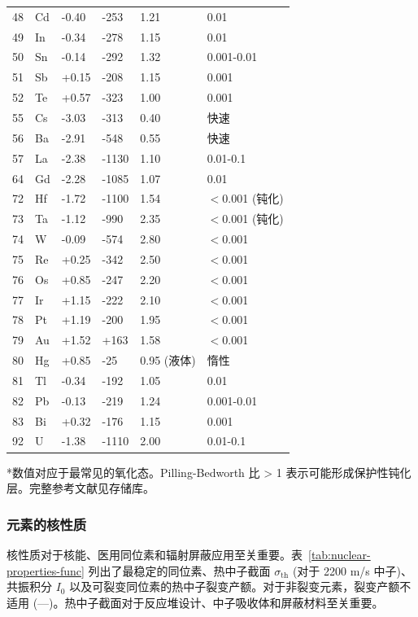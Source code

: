 \documentclass[12pt,a4paper]{article}
\begin{document}
\begin{longtable}{p{0.8cm}p{1.2cm}p{2.5cm}p{2.5cm}p{2.5cm}p{2.5cm}}
		48 & Cd & -0.40 & -253 & 1.21 & 0.01 \\
		49 & In & -0.34 & -278 & 1.15 & 0.01 \\
		50 & Sn & -0.14 & -292 & 1.32 & 0.001-0.01 \\
		51 & Sb & +0.15 & -208 & 1.15 & 0.001 \\
		52 & Te & +0.57 & -323 & 1.00 & 0.001 \\
		55 & Cs & -3.03 & -313 & 0.40 & 快速 \\
		56 & Ba & -2.91 & -548 & 0.55 & 快速 \\
		57 & La & -2.38 & -1130 & 1.10 & 0.01-0.1 \\
		64 & Gd & -2.28 & -1085 & 1.07 & 0.01 \\
		72 & Hf & -1.72 & -1100 & 1.54 & $<$0.001 (钝化) \\
		73 & Ta & -1.12 & -990 & 2.35 & $<$0.001 (钝化) \\
		74 & W  & -0.09 & -574 & 2.80 & $<$0.001 \\
		75 & Re & +0.25 & -342 & 2.50 & $<$0.001 \\
		76 & Os & +0.85 & -247 & 2.20 & $<$0.001 \\
		77 & Ir & +1.15 & -222 & 2.10 & $<$0.001 \\
		78 & Pt & +1.19 & -200 & 1.95 & $<$0.001 \\
		79 & Au & +1.52 & +163 & 1.58 & $<$0.001 \\
		80 & Hg & +0.85 & -25 & 0.95 (液体) & 惰性 \\
		81 & Tl & -0.34 & -192 & 1.05 & 0.01 \\
		82 & Pb & -0.13 & -219 & 1.24 & 0.001-0.01 \\
		83 & Bi & +0.32 & -176 & 1.15 & 0.001 \\
		92 & U  & -1.38 & -1110 & 2.00 & 0.01-0.1 \\
		\bottomrule
	\end{longtable}
	*数值对应于最常见的氧化态。Pilling-Bedworth 比 > 1 表示可能形成保护性钝化层。完整参考文献见存储库。
	
	\subsubsection{元素的核性质}
	\label{subsec:nuclear-properties-func}
	
	核性质对于核能、医用同位素和辐射屏蔽应用至关重要。表~\ref{tab:nuclear-properties-func} 列出了最稳定的同位素、热中子截面 \(\sigma_{\text{th}}\) (对于 2200 m/s 中子)、共振积分 \(I_0\) 以及可裂变同位素的热中子裂变产额。对于非裂变元素，裂变产额不适用 (---)。热中子截面对于反应堆设计、中子吸收体和屏蔽材料至关重要。
	
\end{document}
